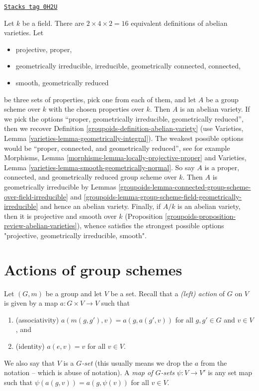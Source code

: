 \begin{remark}[16 equivalent]
\label{groupoids-remark-16-equivalent}
\href{https://stacks.math.columbia.edu/tag/0H2U}{\texttt{Stacks tag 0H2U}}

Let $k$ be a field. There are $2 \times 4 \times 2 = 16$ equivalent
definitions of abelian varieties. Let
\begin{itemize}
\item projective, proper,
\item geometrically irreducible, irreducible, geometrically connected,
connected,
\item smooth, geometrically reduced
\end{itemize}
be three sets of properties, pick one from each of them, and let $A$
be a group scheme over $k$ with the chosen properties over $k$.
Then $A$ is an abelian variety.
If we pick the options ``proper, geometrically irreducible, geometrically
reduced'', then we recover Definition \ref{groupoids-definition-abelian-variety}
(use Varieties, Lemma \ref{varieties-lemma-geometrically-integral}).
The weakest possible options would be ``proper, connected,
and geometrically reduced'', see for example
Morphisms, Lemma \ref{morphisms-lemma-locally-projective-proper} and
Varieties, Lemma \ref{varieties-lemma-smooth-geometrically-normal}.
So say $A$ is a proper, connected,
and geometrically reduced group scheme over $k$.
Then $A$ is geometrically irreducible by
Lemmas \ref{groupoids-lemma-connected-group-scheme-over-field-irreducible} and
\ref{groupoids-lemma-group-scheme-field-geometrically-irreducible}
and hence an abelian variety.
Finally, if $A/k$ is an abelian variety, then it is projective
and smooth over $k$ (Proposition
\ref{groupoids-proposition-review-abelian-varieties}), whence satisfies
the strongest possible options "projective, geometrically irreducible, smooth".
\end{remark}

\section{Actions of group schemes}
\label{groupoids-section-action-group-scheme}
Let $(G, m)$ be a group and let $V$ be a set.
Recall that a {\it (left) action} of $G$ on $V$ is given
by a map $a : G \times V \to V$ such that
\begin{enumerate}
\item (associativity) $a(m(g, g'), v) = a(g, a(g', v))$ for all
$g, g' \in G$ and $v \in V$, and
\item (identity) $a(e, v) = v$ for all $v \in V$.
\end{enumerate}
We also say that $V$ is a {\it $G$-set} (this usually means we
drop the $a$ from the notation -- which is abuse of notation).
A {\it map of $G$-sets} $\psi : V \to V'$ is any set map
such that $\psi(a(g, v)) = a(g, \psi(v))$ for all $v \in V$.

